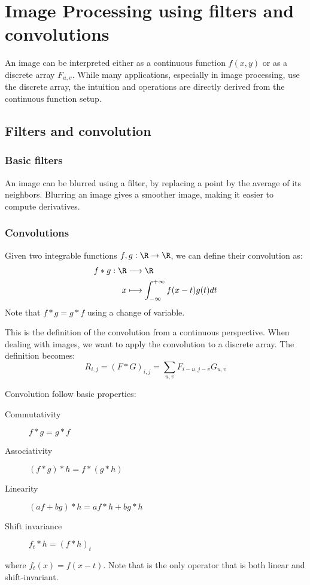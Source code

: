 \section{Image Processing using filters and convolutions}
An image can be interpreted either as a continuous function $f(x, y)$ or as a discrete array $F_{u,v}$. While many applications, especially in image processing, use the discrete array, the intuition and operations are directly derived from the continuous function setup.

\subsection{Filters and convolution}
\subsubsection{Basic filters}
An image can be blurred using a filter, by replacing a point by the average of its neighbors. Blurring an image gives a smoother image, making it easier to compute derivatives. 


\subsubsection{Convolutions}
Given two integrable functions $f, g:\R\to\R$, we can define their convolution as:
\begin{align*}
    f*g: \R&\longrightarrow \R\\
    x&\longmapsto\int_{-\infty}^{+\infty}f(x-t)g(t)dt
\end{align*}
Note that $f*g=g*f$ using a change of variable.

This is the definition of the convolution from a continuous perspective. When dealing with images, we want to apply the convolution to a discrete array. The definition becomes:
\begin{equation*}
    R_{i,j} = (F*G)_{i,j} = \sum_{u,v} F_{i-u, j-v}G_{u,v}
\end{equation*}


Convolution follow basic properties:
\begin{description}
    \item[Commutativity] $f*g=g*f$
    \item[Associativity] $(f*g)*h = f*(g*h)$
    \item[Linearity] $(af+bg)*h = af*h + bg*h$
    \item[Shift invariance] $f_t * h = (f*h)_t$
\end{description}
where $f_t(x) = f(x-t)$.
Note that is the only operator that is both linear and shift-invariant.

